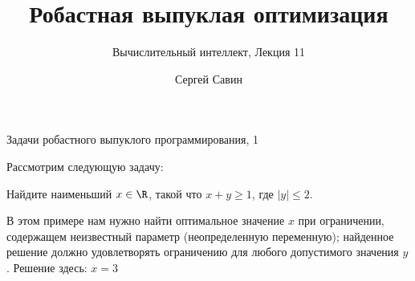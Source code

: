 \documentclass{beamer}
\title{ Робастная выпуклая оптимизация }
\subtitle{Вычислительный интеллект, Лекция  11}
\author{Сергей Савин}
\date{\mydate}
\begin{document}
\maketitle



%
%



\begin{frame}{Задачи робастного выпуклого программирования, 1}
	\begin{flushleft}
		
		Рассмотрим следующую задачу:
		
		\begin{example}
			Найдите наименьший $x \in \R$, такой что $x + y \geq 1$, где $|y| \leq 2$.
		\end{example}
		
		\bigskip
		
		В этом примере нам нужно найти оптимальное значение $x$ при ограничении, содержащем неизвестный параметр (неопределенную переменную); найденное решение должно удовлетворять ограничению для любого допустимого значения $y$. Решение здесь: $x = 3$
		
		
	\end{flushleft}
\end{frame}
\end{document}
